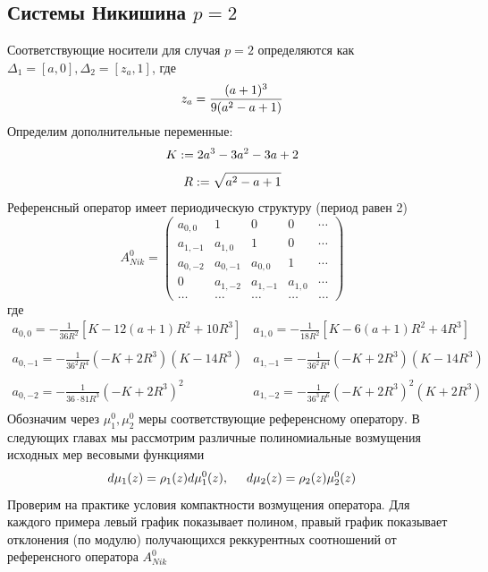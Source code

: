 \documentclass{report}
\begin{document}
\newpage
\subsection {Системы Никишина $p=2$}
Соответствующие носители для случая $p=2$ определяются как $\Delta_1=[a,0], \Delta_2 =[z_a,1]$, где
$$
z_a=\frac{(a+1)^3}{9(a^2-a+1)} \\
$$
Определим дополнительные переменные:
$$
K:=2a^3-3a^2-3a+2 \\ 
$$
$$
R:=\sqrt{a^2-a+1} \\
$$
Референсный оператор имеет периодическую структуру (период равен 2) 
$$
A_{Nik}^0=
\left(\begin{array}{cccccccccccc}
a_{0,0}  & 1 		& 0 	  & 0 		 &  \cdots \\
a_{1,-1} & a_{1,0}  & 1 	  & 0 		 &  \cdots \\
a_{0,-2} & a_{0,-1} & a_{0,0} & 1 		 &  \cdots \\
0 		 & a_{1,-2} & a_{1,-1} & a_{1,0} &  \cdots \\
\ldots & \ldots & \ldots & \ldots & \ldots
\end{array}\right)
$$
где 
$$
\begin{array}{llllllllllllllll}
a_{0,0} = -\displaystyle\frac {1}{36R^2} [K - 12(a+1)R^2+10R^3] & a_{1,0}=-\displaystyle\frac{1}{18R^2}[K-6(a+1)R^2+4R^3] \\ \\ 
a_{0,-1}= -\displaystyle\frac {1}{36^2R^4}(-K+2R^3)(K-14R^3) & a_{1,-1}=-\displaystyle\frac{1}{36^2R^4}(-K+2R^3)(K-14R^3) \\ \\
a_{0,-2}= -\displaystyle\frac {1}{36 \cdot 81 R^3}(-K+2R^3)^2 & a_{1,-2}=-\displaystyle\frac{1}{36^3R^6}(-K+2R^3)^2(K+2R^3) \\
\end{array}
$$
Обозначим через $\mu_1^0, \mu_2^0$ меры соответствующие референсному оператору.
В следующих главах мы рассмотрим различные полиномиальные возмущения исходных мер весовыми функциями
$$
d\mu_1(z)= \rho_1(z) d\mu_1^0 (z) , \hspace{0.5cm} d\mu_2(z) =  \rho_2(z) \mu^0_2(z)
$$
Проверим на практике условия компактности возмущения оператора. 
Для каждого примера левый график показывает полином, правый график показывает отклонения (по модулю) получающихся реккурентных соотношений от референсного оператора $A_{Nik}^0$  


\newpage
\end{document}
